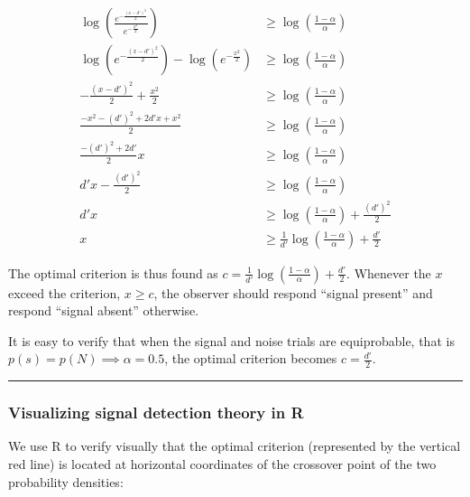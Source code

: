 \documentclass[
]{book}
\begin{document}
\[
\begin{aligned}
 \log \left(\frac{e^{-\frac{(x-d')^2}{2}}}{e^{-\frac{x^2}{2}}} \right) & \ge \log \left(\frac{1-\alpha}{\alpha}\right) \\
  \log \left(e^{-\frac{(x-d')^2}{2}} \right) - \log \left(e^{-\frac{x^2}{2}} \right) & \ge \log \left(\frac{1-\alpha}{\alpha}\right) \\
-\frac{(x-d')^2}{2} + \frac{x^2}{2}  & \ge \log \left(\frac{1-\alpha}{\alpha}\right) \\
\frac{-x^2 -(d')^2 + 2d' x + x^2 }{2} & \ge \log \left(\frac{1-\alpha}{\alpha}\right) \\
\frac{-(d')^2 + 2d'}{2}x & \ge \log \left(\frac{1-\alpha}{\alpha}\right) \\
d'x -\frac{(d')^2}{2}& \ge \log \left(\frac{1-\alpha}{\alpha}\right) \\
d'x & \ge \log \left(\frac{1-\alpha}{\alpha}\right) + \frac{(d')^2}{2}\\
x & \ge \frac{1}{d'}\log \left(\frac{1-\alpha}{\alpha}\right)+ \frac{d'}{2}
\end{aligned}
\]

The optimal criterion is thus found as \(c = \frac{1}{d'}\log \left(\frac{1-\alpha}{\alpha}\right)+ \frac{d'}{2}\). Whenever the \(x\) exceed the criterion, \(x \ge c\), the observer should respond ``signal present'' and respond ``signal absent'' otherwise.

It is easy to verify that when the signal and noise trials are equiprobable, that is \(p(s) = p(N) \implies \alpha=0.5\), the optimal criterion becomes \(c=\frac{d'}{2}\).

\begin{center}\rule{0.5\linewidth}{0.5pt}\end{center}

\subsubsection{Visualizing signal detection theory in R}\label{visualizing-signal-detection-theory-in-r}

We use R to verify visually that the optimal criterion (represented by the vertical red line) is located at horizontal coordinates of the crossover point of the two probability densities:
\end{document}
